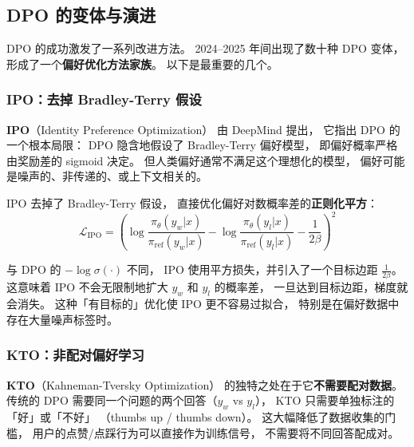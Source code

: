 \subsection{DPO 的变体与演进}

DPO 的成功激发了一系列改进方法。
2024--2025 年间出现了数十种 DPO 变体，
形成了一个\textbf{偏好优化方法家族}。
以下是最重要的几个。

\subsubsection{IPO：去掉 Bradley-Terry 假设}


\textbf{IPO}（Identity Preference Optimization）
由 DeepMind 提出，
它指出 DPO 的一个根本局限：
DPO 隐含地假设了 Bradley-Terry 偏好模型，
即偏好概率严格由奖励差的 sigmoid 决定。
但人类偏好通常不满足这个理想化的模型，
偏好可能是噪声的、非传递的、或上下文相关的。

IPO 去掉了 Bradley-Terry 假设，
直接优化偏好对数概率差的\textbf{正则化平方}：
\begin{equation}
  \mathcal{L}_{\text{IPO}} = \left(
    \log \frac{\pi_\theta(y_w|x)}{\pi_{\text{ref}}(y_w|x)}
    - \log \frac{\pi_\theta(y_l|x)}{\pi_{\text{ref}}(y_l|x)}
    - \frac{1}{2\beta}
  \right)^2
  \label{eq:ipo}
\end{equation}

与 DPO 的 $-\log\sigma(\cdot)$ 不同，
IPO 使用平方损失，并引入了一个目标边距 $\frac{1}{2\beta}$。
这意味着 IPO 不会无限制地扩大 $y_w$ 和 $y_l$ 的概率差，
一旦达到目标边距，梯度就会消失。
这种「有目标的」优化使 IPO 更不容易过拟合，
特别是在偏好数据中存在大量噪声标签时。

\subsubsection{KTO：非配对偏好学习}

\textbf{KTO}（Kahneman-Tversky Optimization）
的独特之处在于它\textbf{不需要配对数据}。
传统的 DPO 需要同一个问题的两个回答（$y_w$ vs $y_l$），
KTO 只需要单独标注的「好」或「不好」
（thumbs up / thumbs down）。
这大幅降低了数据收集的门槛，
用户的点赞/点踩行为可以直接作为训练信号，
不需要将不同回答配成对。


